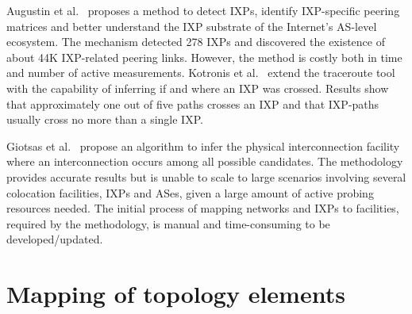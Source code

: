 	Augustin et al.~\cite{Augustin:2009:IM:1644893.1644934} proposes a method to detect IXPs, identify IXP-specific peering matrices and better understand the IXP substrate of the Internet’s AS-level ecosystem. The mechanism detected 278 IXPs and discovered the existence of about 44K IXP-related peering links. However, the method is costly both in time and number of active measurements. Kotronis et al.~\cite{nomikos2016traixroute} extend the traceroute tool with the capability of inferring if and where an IXP was crossed. Results show that approximately one out of five paths crosses an IXP and that IXP-paths usually cross no more than a single IXP. 

	Giotsas et al.~\cite{Giotsas:2015:MPI:2716281.2836122} propose an algorithm to infer the physical interconnection facility where an interconnection occurs among all possible candidates. The methodology provides accurate results but is unable to scale to large scenarios involving several colocation facilities, IXPs and ASes, given a large amount of active probing resources needed. The initial process of mapping networks and IXPs to facilities, required by the methodology, is manual and time-consuming to be developed/updated.

	
	

	\section{Mapping of topology elements}
	\label{sec:rel-work-mapping-topo-elem}



